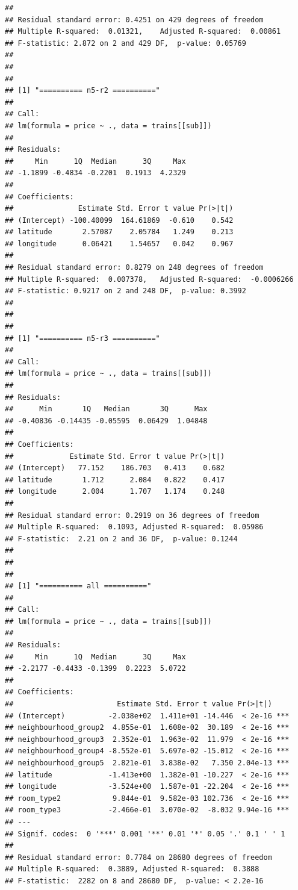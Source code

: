 \documentclass[
]{article}
\begin{document}
\begin{verbatim}
## 
## Residual standard error: 0.4251 on 429 degrees of freedom
## Multiple R-squared:  0.01321,    Adjusted R-squared:  0.00861 
## F-statistic: 2.872 on 2 and 429 DF,  p-value: 0.05769
## 
## 
## 
## [1] "========== n5-r2 =========="
## 
## Call:
## lm(formula = price ~ ., data = trains[[sub]])
## 
## Residuals:
##     Min      1Q  Median      3Q     Max 
## -1.1899 -0.4834 -0.2201  0.1913  4.2329 
## 
## Coefficients:
##               Estimate Std. Error t value Pr(>|t|)
## (Intercept) -100.40099  164.61869  -0.610    0.542
## latitude       2.57087    2.05784   1.249    0.213
## longitude      0.06421    1.54657   0.042    0.967
## 
## Residual standard error: 0.8279 on 248 degrees of freedom
## Multiple R-squared:  0.007378,   Adjusted R-squared:  -0.0006266 
## F-statistic: 0.9217 on 2 and 248 DF,  p-value: 0.3992
## 
## 
## 
## [1] "========== n5-r3 =========="
## 
## Call:
## lm(formula = price ~ ., data = trains[[sub]])
## 
## Residuals:
##      Min       1Q   Median       3Q      Max 
## -0.40836 -0.14435 -0.05595  0.06429  1.04848 
## 
## Coefficients:
##             Estimate Std. Error t value Pr(>|t|)
## (Intercept)   77.152    186.703   0.413    0.682
## latitude       1.712      2.084   0.822    0.417
## longitude      2.004      1.707   1.174    0.248
## 
## Residual standard error: 0.2919 on 36 degrees of freedom
## Multiple R-squared:  0.1093, Adjusted R-squared:  0.05986 
## F-statistic:  2.21 on 2 and 36 DF,  p-value: 0.1244
## 
## 
## 
## [1] "========== all =========="
## 
## Call:
## lm(formula = price ~ ., data = trains[[sub]])
## 
## Residuals:
##     Min      1Q  Median      3Q     Max 
## -2.2177 -0.4433 -0.1399  0.2223  5.0722 
## 
## Coefficients:
##                        Estimate Std. Error t value Pr(>|t|)    
## (Intercept)          -2.038e+02  1.411e+01 -14.446  < 2e-16 ***
## neighbourhood_group2  4.855e-01  1.608e-02  30.189  < 2e-16 ***
## neighbourhood_group3  2.352e-01  1.963e-02  11.979  < 2e-16 ***
## neighbourhood_group4 -8.552e-01  5.697e-02 -15.012  < 2e-16 ***
## neighbourhood_group5  2.821e-01  3.838e-02   7.350 2.04e-13 ***
## latitude             -1.413e+00  1.382e-01 -10.227  < 2e-16 ***
## longitude            -3.524e+00  1.587e-01 -22.204  < 2e-16 ***
## room_type2            9.844e-01  9.582e-03 102.736  < 2e-16 ***
## room_type3           -2.466e-01  3.070e-02  -8.032 9.94e-16 ***
## ---
## Signif. codes:  0 '***' 0.001 '**' 0.01 '*' 0.05 '.' 0.1 ' ' 1
## 
## Residual standard error: 0.7784 on 28680 degrees of freedom
## Multiple R-squared:  0.3889, Adjusted R-squared:  0.3888 
## F-statistic:  2282 on 8 and 28680 DF,  p-value: < 2.2e-16
\end{verbatim}
\end{document}
